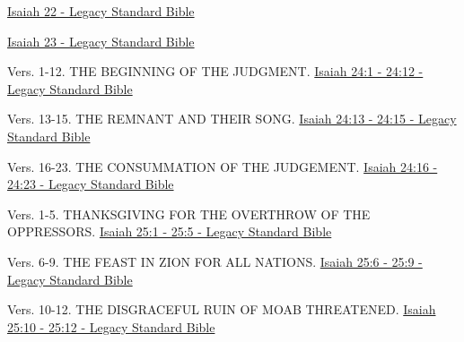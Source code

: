 \documentclass[
  ignorenonframetext,
]{beamer}
\begin{document}
\begin{frame}{22}
\label{section-52}
\href{https://read.lsbible.org/?q=is22}{Isaiah 22 - Legacy Standard
Bible}
\end{frame}

\begin{frame}{23}
\label{section-53}
\href{https://read.lsbible.org/?q=is23}{Isaiah 23 - Legacy Standard
Bible}
\end{frame}

\begin{frame}{24}
\label{section-54}
\begin{block}{Vers. 1-12. THE BEGINNING OF THE JUDGMENT.}
\label{vers.-1-12.-the-beginning-of-the-judgment.}
\href{https://read.lsbible.org/?q=is24\%3A1-12}{Isaiah 24:1 - 24:12 -
Legacy Standard Bible}
\end{block}

\begin{block}{Vers. 13-15. THE REMNANT AND THEIR SONG.}
\label{vers.-13-15.-the-remnant-and-their-song.}
\href{https://read.lsbible.org/?q=is24\%3A13-15}{Isaiah 24:13 - 24:15 -
Legacy Standard Bible}
\end{block}

\begin{block}{Vers. 16-23. THE CONSUMMATION OF THE JUDGEMENT.}
\label{vers.-16-23.-the-consummation-of-the-judgement.}
\href{https://read.lsbible.org/?q=is24\%3A16-23}{Isaiah 24:16 - 24:23 -
Legacy Standard Bible}
\end{block}
\end{frame}

\begin{frame}{25}
\label{section-55}
\begin{block}{Vers. 1-5. THANKSGIVING FOR THE OVERTHROW OF THE
OPPRESSORS.}
\label{vers.-1-5.-thanksgiving-for-the-overthrow-of-the-oppressors.}
\href{https://read.lsbible.org/?q=is25\%3A1-5}{Isaiah 25:1 - 25:5 -
Legacy Standard Bible}
\end{block}

\begin{block}{Vers. 6-9. THE FEAST IN ZION FOR ALL NATIONS.}
\label{vers.-6-9.-the-feast-in-zion-for-all-nations.}
\href{https://read.lsbible.org/?q=is25\%3A6-9}{Isaiah 25:6 - 25:9 -
Legacy Standard Bible}
\end{block}

\begin{block}{Vers. 10-12. THE DISGRACEFUL RUIN OF MOAB THREATENED.}
\label{vers.-10-12.-the-disgraceful-ruin-of-moab-threatened.}
\href{https://read.lsbible.org/?q=is25\%3A10-12}{Isaiah 25:10 - 25:12 -
Legacy Standard Bible}
\end{block}
\end{frame}
\end{document}
